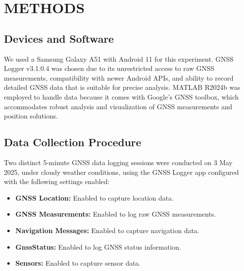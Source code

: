 
\section{METHODS} \label{sec:methods}


    \subsection{Devices and Software}
    
        We used a Samsung Galaxy A51 with Android 11 for this experiment.
        GNSS Logger v3.1.0.4 was chosen due to its unrestricted access to raw GNSS measurements, compatibility with newer Android APIs, and ability to record detailed GNSS data that is suitable for precise analysis.
        MATLAB R2024b was employed to handle data because it comes with Google's GNSS toolbox, which accommodates robust analysis and visualization of GNSS measurements and position solutions.
        
    \subsection{Data Collection Procedure}
    
        Two distinct 5-minute GNSS data logging sessions were conducted on 3 May 2025, under cloudy weather conditions, using the GNSS Logger app configured with the following settings enabled:

        \begin{itemize}
            \item \textbf{GNSS Location:} Enabled to capture location data.
            \item \textbf{GNSS Measurements:} Enabled to log raw GNSS measurements.
            \item \textbf{Navigation Messages:} Enabled to capture navigation data.
            \item \textbf{GnssStatus:} Enabled to log GNSS status information.
            \item \textbf{Sensors:} Enabled to capture sensor data.
        \end{itemize}
        
